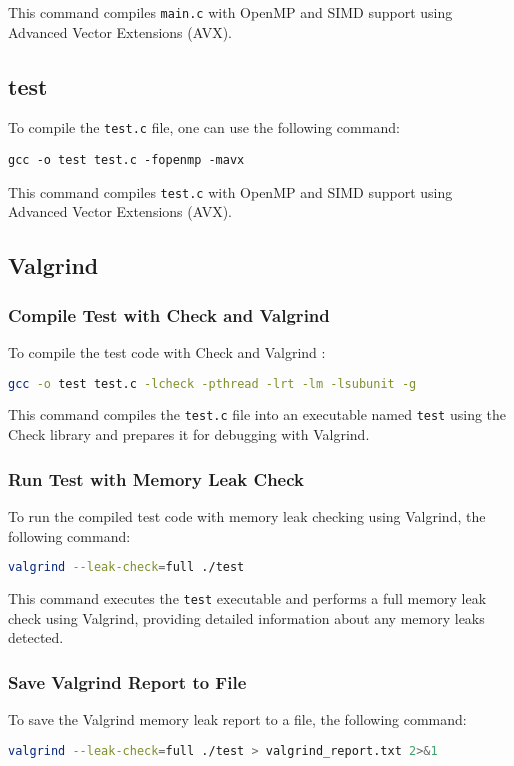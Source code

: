 \documentclass{article}
\begin{document}
This command compiles \texttt{main.c} with OpenMP and SIMD support using Advanced Vector Extensions (AVX).

\subsection{test}

To compile the \texttt{test.c} file, one  can use the following command:

\begin{verbatim}
gcc -o test test.c -fopenmp -mavx
\end{verbatim}

This command compiles \texttt{test.c} with OpenMP and SIMD support using Advanced Vector Extensions (AVX).

\subsection{Valgrind}

\subsubsection{Compile Test with Check and Valgrind}
To compile the test code with Check and Valgrind :
\begin{lstlisting}[language=bash]
gcc -o test test.c -lcheck -pthread -lrt -lm -lsubunit -g
\end{lstlisting}
This command compiles the \texttt{test.c} file into an executable named \texttt{test} using the Check library and prepares it for debugging with Valgrind.

\subsubsection{Run Test with Memory Leak Check}
To run the compiled test code with memory leak checking using Valgrind, the following command:
\begin{lstlisting}[language=bash]
valgrind --leak-check=full ./test
\end{lstlisting}
This command executes the \texttt{test} executable and performs a full memory leak check using Valgrind, providing detailed information about any memory leaks detected.

\subsubsection{Save Valgrind Report to File}
To save the Valgrind memory leak report to a file, the following command:
\begin{lstlisting}[language=bash]
valgrind --leak-check=full ./test > valgrind_report.txt 2>&1
\end{lstlisting}
\end{document}
